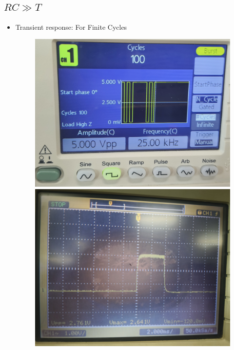 \documentclass[12pt,a4paper]{report}
\begin{document}
\subsection{$RC \gg T$}
\begin{itemize}
    \item Transient response: For Finite Cycles
    \begin{figure}[H] %
    \centering
    \begin{minipage}[c]{0.48\textwidth}
        \includegraphics[width=\textwidth]{figs/t3_1.jpg} %
        
    \end{minipage}
    \hfill
    \begin{minipage}[c]{0.48\textwidth}
        \includegraphics[width=\textwidth]{figs/tr3_1.jpg} %
        

\end{minipage}
\end{figure}
\end{itemize}
\end{document}
